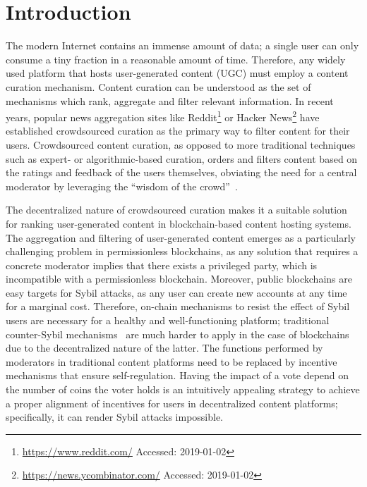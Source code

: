 \section{Introduction}
  The modern Internet contains an immense amount of data; a single user can only
  consume a tiny fraction in a reasonable amount of time. Therefore, any widely
  used platform that hosts user-generated content (UGC) must employ a content
  curation mechanism. Content curation can be understood as the set of
  mechanisms which rank, aggregate and filter relevant information. In recent
  years, popular news aggregation sites like
  Reddit\footnote{\url{https://www.reddit.com/} Accessed: 2019-01-02} or Hacker
  News\footnote{\url{https://news.ycombinator.com/} Accessed: 2019-01-02} have
  established crowdsourced curation as the primary way to filter content for
  their users. Crowdsourced content curation, as opposed to more traditional
  techniques such as expert- or algorithmic-based curation, orders and filters
  content based on the ratings and feedback of the users themselves, obviating
  the need for a central moderator by leveraging the ``wisdom of the
  crowd''~\cite{askalidis2013theoretical}.

  The decentralized nature of crowdsourced curation makes it a suitable solution
  for ranking user-generated content in blockchain-based content hosting
  systems. The aggregation and filtering of user-generated content emerges as a
  particularly challenging problem in permissionless blockchains, as any
  solution that requires a concrete moderator implies that there exists a
  privileged party, which is incompatible with a permissionless blockchain.
  Moreover, public blockchains are easy targets for Sybil attacks, as any user
  can create new accounts at any time for a marginal cost. Therefore, on-chain
  mechanisms to resist the effect of Sybil users are necessary for a healthy and
  well-functioning platform; traditional counter-Sybil
  mechanisms~\cite{levine2006survey} are much harder to apply in the case of
  blockchains due to the decentralized nature of the latter. The functions
  performed by moderators in traditional content platforms need to be replaced
  by incentive mechanisms that ensure self-regulation. Having the impact of a
  vote depend on the number of coins the voter holds is an intuitively appealing
  strategy to achieve a proper alignment of incentives for users in
  decentralized content platforms; specifically, it can render Sybil attacks
  impossible.


